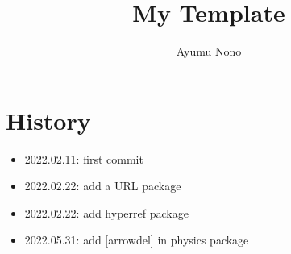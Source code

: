 \documentclass[dvipdfmx,autodetect-engine]{article}
\title{My Template}
\author{Ayumu Nono}
\begin{document}
\maketitle


\section{History}
\begin{itemize}
    \item 2022.02.11: first commit
    \item 2022.02.22: add a URL package
    \item 2022.02.22: add hyperref package
    \item 2022.05.31: add [arrowdel] in physics package
\end{itemize}
\end{document}
